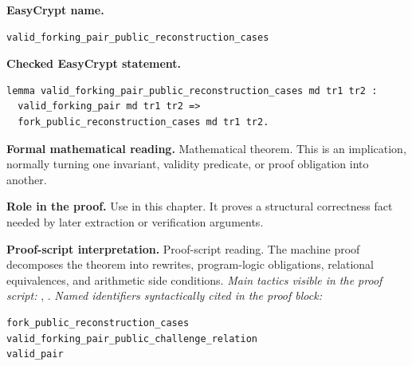 \begin{formaltheorem}
\noindent\textbf{EasyCrypt name.}
\begin{lstlisting}[language=EasyCrypt,basicstyle=\ttfamily\scriptsize]
valid_forking_pair_public_reconstruction_cases
\end{lstlisting}
\noindent\textbf{Checked EasyCrypt statement.}
\begin{lstlisting}[language=EasyCrypt,basicstyle=\ttfamily\scriptsize]
lemma valid_forking_pair_public_reconstruction_cases md tr1 tr2 :
  valid_forking_pair md tr1 tr2 =>
  fork_public_reconstruction_cases md tr1 tr2.
\end{lstlisting}
\noindent\textbf{Formal mathematical reading.}
Mathematical theorem. This is an implication, normally turning one invariant, validity predicate, or proof obligation into another.

\noindent\textbf{Role in the proof.}
Use in this chapter. It proves a structural correctness fact needed by later extraction or verification arguments.

\noindent\textbf{Proof-script interpretation.}
Proof-script reading. The machine proof decomposes the theorem into rewrites, program-logic obligations, relational equivalences, and arithmetic side conditions.
\emph{Main tactics visible in the proof script:} , .
\emph{Named identifiers syntactically cited in the proof block:}
\begin{lstlisting}[language=EasyCrypt,basicstyle=\ttfamily\scriptsize]
fork_public_reconstruction_cases
valid_forking_pair_public_challenge_relation
valid_pair
\end{lstlisting}

\end{formaltheorem}

